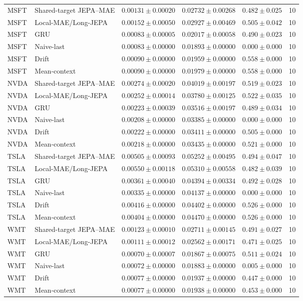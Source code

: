 \begin{longtable}{llrrrr}
MSFT & Shared-target JEPA--MAE & $0.00131 \pm 0.00020$ & $0.02732 \pm 0.00268$ & $0.482 \pm 0.025$ & 10 \\
MSFT & Local-MAE/Long-JEPA & $0.00152 \pm 0.00050$ & $0.02927 \pm 0.00469$ & $0.505 \pm 0.042$ & 10 \\
MSFT & GRU & $0.00083 \pm 0.00005$ & $0.02017 \pm 0.00058$ & $0.490 \pm 0.023$ & 10 \\
MSFT & Naive-last & $0.00083 \pm 0.00000$ & $0.01893 \pm 0.00000$ & $0.000 \pm 0.000$ & 10 \\
MSFT & Drift & $0.00090 \pm 0.00000$ & $0.01959 \pm 0.00000$ & $0.558 \pm 0.000$ & 10 \\
MSFT & Mean-context & $0.00090 \pm 0.00000$ & $0.01979 \pm 0.00000$ & $0.558 \pm 0.000$ & 10 \\
NVDA & Shared-target JEPA--MAE & $0.00274 \pm 0.00020$ & $0.04019 \pm 0.00197$ & $0.519 \pm 0.023$ & 10 \\
NVDA & Local-MAE/Long-JEPA & $0.00252 \pm 0.00014$ & $0.03780 \pm 0.00125$ & $0.522 \pm 0.035$ & 10 \\
NVDA & GRU & $0.00223 \pm 0.00039$ & $0.03516 \pm 0.00197$ & $0.489 \pm 0.034$ & 10 \\
NVDA & Naive-last & $0.00208 \pm 0.00000$ & $0.03385 \pm 0.00000$ & $0.000 \pm 0.000$ & 10 \\
NVDA & Drift & $0.00222 \pm 0.00000$ & $0.03411 \pm 0.00000$ & $0.505 \pm 0.000$ & 10 \\
NVDA & Mean-context & $0.00218 \pm 0.00000$ & $0.03435 \pm 0.00000$ & $0.521 \pm 0.000$ & 10 \\
TSLA & Shared-target JEPA--MAE & $0.00505 \pm 0.00093$ & $0.05252 \pm 0.00495$ & $0.494 \pm 0.047$ & 10 \\
TSLA & Local-MAE/Long-JEPA & $0.00550 \pm 0.00118$ & $0.05310 \pm 0.00558$ & $0.482 \pm 0.039$ & 10 \\
TSLA & GRU & $0.00361 \pm 0.00040$ & $0.04394 \pm 0.00334$ & $0.492 \pm 0.028$ & 10 \\
TSLA & Naive-last & $0.00335 \pm 0.00000$ & $0.04137 \pm 0.00000$ & $0.000 \pm 0.000$ & 10 \\
TSLA & Drift & $0.00416 \pm 0.00000$ & $0.04402 \pm 0.00000$ & $0.526 \pm 0.000$ & 10 \\
TSLA & Mean-context & $0.00404 \pm 0.00000$ & $0.04470 \pm 0.00000$ & $0.526 \pm 0.000$ & 10 \\
WMT & Shared-target JEPA--MAE & $0.00123 \pm 0.00010$ & $0.02711 \pm 0.00145$ & $0.491 \pm 0.027$ & 10 \\
WMT & Local-MAE/Long-JEPA & $0.00111 \pm 0.00012$ & $0.02562 \pm 0.00171$ & $0.471 \pm 0.025$ & 10 \\
WMT & GRU & $0.00070 \pm 0.00007$ & $0.01867 \pm 0.00075$ & $0.511 \pm 0.024$ & 10 \\
WMT & Naive-last & $0.00072 \pm 0.00000$ & $0.01883 \pm 0.00000$ & $0.005 \pm 0.000$ & 10 \\
WMT & Drift & $0.00077 \pm 0.00000$ & $0.01937 \pm 0.00000$ & $0.447 \pm 0.000$ & 10 \\
WMT & Mean-context & $0.00077 \pm 0.00000$ & $0.01938 \pm 0.00000$ & $0.453 \pm 0.000$ & 10 \\
\bottomrule
\end{longtable}

